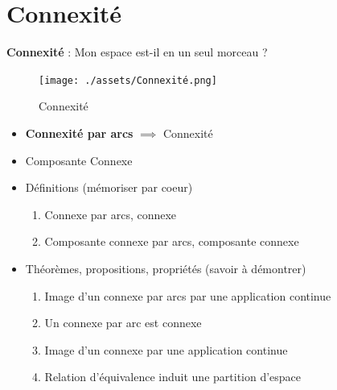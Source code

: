 \chapter{Connexité}


\begin{tcolorbox}
    \textbf{Connexité} : Mon espace est-il en un seul morceau ?
      \begin{figure}[H] %
        \centering
        \texttt{[image: ./assets/Connexité.png]}
        \caption{Connexité}
        \label{fig:Connexité}
      \end{figure}

      
      \begin{itemize}
        \item \textbf{Connexité par arcs} $\implies$ Connexité
        \item Composante Connexe
      \end{itemize}


\end{tcolorbox}

\begin{tcolorbox}
    
\begin{itemize}

    \item Définitions (mémoriser par coeur)

      \begin{enumerate}

          \item Connexe par arcs, connexe
          \item Composante connexe par arcs, composante connexe 

      \end{enumerate}

    \item Théorèmes, propositions, propriétés (savoir à démontrer)
      \begin{enumerate}

          \item Image d’un connexe par arcs par une application continue 
          \item Un connexe par arc est connexe 
          \item Image d’un connexe par une application continue 
          \item Relation d’équivalence induit une partition d’espace

      \end{enumerate}

\end{itemize}
\end{tcolorbox}


